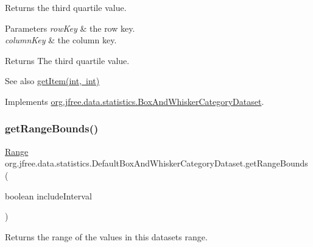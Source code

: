Returns the third quartile value.


\begin{DoxyParams}{Parameters}
{\em row\+Key} & the row key. \\
\hline
{\em column\+Key} & the column key.\\
\hline
\end{DoxyParams}
\begin{DoxyReturn}{Returns}
The third quartile value.
\end{DoxyReturn}
\begin{DoxySeeAlso}{See also}
\mbox{\hyperlink{classorg_1_1jfree_1_1data_1_1statistics_1_1_default_box_and_whisker_category_dataset_a85c944b06e4337059ea728b3a744e2a9}{get\+Item(int, int)}} 
\end{DoxySeeAlso}


Implements \mbox{\hyperlink{interfaceorg_1_1jfree_1_1data_1_1statistics_1_1_box_and_whisker_category_dataset_a2dfb9e06fad335ed51a486a44ae18acb}{org.\+jfree.\+data.\+statistics.\+Box\+And\+Whisker\+Category\+Dataset}}.

\mbox{\label{classorg_1_1jfree_1_1data_1_1statistics_1_1_default_box_and_whisker_category_dataset_a52f3bf900ae6f640a115f6872e702f01}} 
\subsubsection{\texorpdfstring{get\+Range\+Bounds()}{getRangeBounds()}}
{\footnotesize\ttfamily \mbox{\hyperlink{classorg_1_1jfree_1_1data_1_1_range}{Range}} org.\+jfree.\+data.\+statistics.\+Default\+Box\+And\+Whisker\+Category\+Dataset.\+get\+Range\+Bounds (\begin{DoxyParamCaption}\item[{boolean}]{include\+Interval }\end{DoxyParamCaption})}

Returns the range of the values in this dataset\textquotesingle{}s range.


